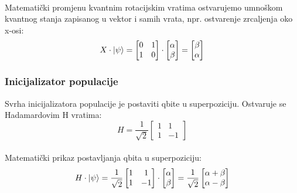 \documentclass[times, utf8, zavrsni]{fer}
\begin{document}
\paragraph{}
Matematički promjenu kvantnim rotacijskim vratima ostvarujemo umnoškom kvantnog stanja zapisanog u vektor i samih vrata, npr. ostvarenje zrcaljenja oko x-osi:
\begin{equation}
X\cdot \ket{\psi} = 
\begin{bmatrix}
0 & 1 \\ 1 & 0
\end{bmatrix} \cdot
\begin{bmatrix}
\alpha \\ \beta
\end{bmatrix}
= \begin{bmatrix}
\beta \\ \alpha
\end{bmatrix}
\end{equation}

\subsubsection{Inicijalizator populacije}
Svrha inicijalizatora populacije je postaviti qbite u superpoziciju. Ostvaruje se Hadamardovim H vratima:
\begin{equation}
H = \frac{1}{\sqrt{2}}
\begin{bmatrix}
1 & 1 \\ 1 & -1
\end{bmatrix} 
\end{equation}

\paragraph{}
Matematički prikaz postavljanja qbita u superpoziciju:
\begin{equation}
H\cdot \ket{\psi} = \frac{1}{\sqrt{2}}
\begin{bmatrix}
1 & 1 \\ 1 & -1
\end{bmatrix} \cdot
\begin{bmatrix}
\alpha \\ \beta
\end{bmatrix}
 = \frac{1}{\sqrt{2}}
\begin{bmatrix}
\alpha + \beta \\ \alpha - \beta
\end{bmatrix}
\end{equation}
\end{document}
